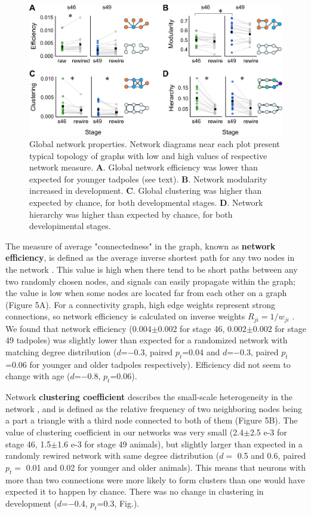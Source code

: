 \documentclass{article}
\begin{document}
\begin{figure}[t]
\includegraphics[width=\linewidth]{fig5.pdf}
\caption{
Global network properties. Network diagrams near each plot present typical topology of graphs with low and high values of respective network measure. \textbf{A}. Global network efficiency was lower than expected for younger tadpoles (see text). \textbf{B}. Network modularity increased in development. \textbf{C}. Global clustering was higher than expected by chance, for both developmental stages. \textbf{D}. Network hierarchy was higher than expected by chance, for both developimental stages. }
\end{figure}

The measure of average "connectedness" in the graph, known as \textbf{network efficiency}, is defined as the average inverse shortest path for any two nodes in the network \citep{latora2001efficiency}. This value is high when there tend to be short paths between any two randomly chosen nodes, and signals can easily propagate within the graph; the value is low when some nodes are located far from each other on a graph (Figure 5A). For a connectivity graph, high edge weights represent strong connections, so network efficiency is calculated on inverse weights $R_{ji} = 1/w_{ji}$ \citep{rubinov2010toolbox}. We found that network efficiency (0.004$\pm$0.002 for stage 46, 0.002$\pm$0.002 for stage 49 tadpoles) was slightly lower than expected for a randomized network with matching degree distribution ($d$=$-$0.3, paired $p_t$=0.04 and $d$=$-$0.3, paired $p_t$=0.06 for younger and older tadpoles respectively). Efficiency did not seem to change with age ($d$=$-$0.8, $p_t$=0.06).

Network \textbf{clustering coefficient} describes the small-scale heterogeneity in the network \citep{fagiolo2007}, and is defined as the relative frequency of two neighboring nodes being a part a triangle with a third node connected to both of them (Figure 5B). The value of clustering coefficient in our networks was very small (2.4$\pm$2.5 e-3 for stage 46, 1.5$\pm$1.6 e-3 for stage 49 animals), but slightly larger than expected in a randomly rewired network with same degree distribution ($d=$ 0.5 and 0.6, paired $p_t=$ 0.01 and 0.02 for younger and older animals). This means that neurons with more than two connections were more likely to form clusters than one would have expected it to happen by chance. There was no change in clustering in development ($d$=$-$0.4, $p_t$=0.3, Fig.).
\end{document}
